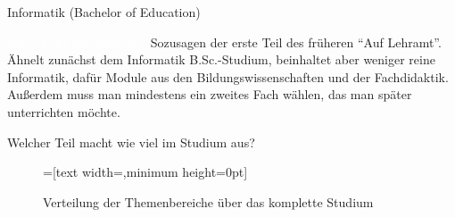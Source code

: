 
\begin{Huge}
	  Informatik (Bachelor of Education)
\end{Huge}

\begin{exampleblock}{\textcolor{white}{Was ist der Studiengang?}}
  Sozusagen der erste Teil des früheren "`Auf Lehramt"'. Ähnelt zunächst dem Informatik B.Sc.-Studium, beinhaltet aber weniger reine Informatik, dafür Module aus den Bildungswissenschaften und der Fachdidaktik. Außerdem muss man mindestens ein zweites Fach wählen, das man später unterrichten möchte.
\end{exampleblock}

\begin{block}{Welcher Teil macht wie viel im Studium aus?}
	\begin{figure}[h!]
		\vspace{-10pt}
		\begin{minipage}{\linewidth}
				\centering
				=[text width={},minimum height=0pt]
		\end{minipage}
		\vspace{-20pt}
		\caption{Verteilung der Themenbereiche über das komplette Studium}
	\end{figure}
\end{block}

